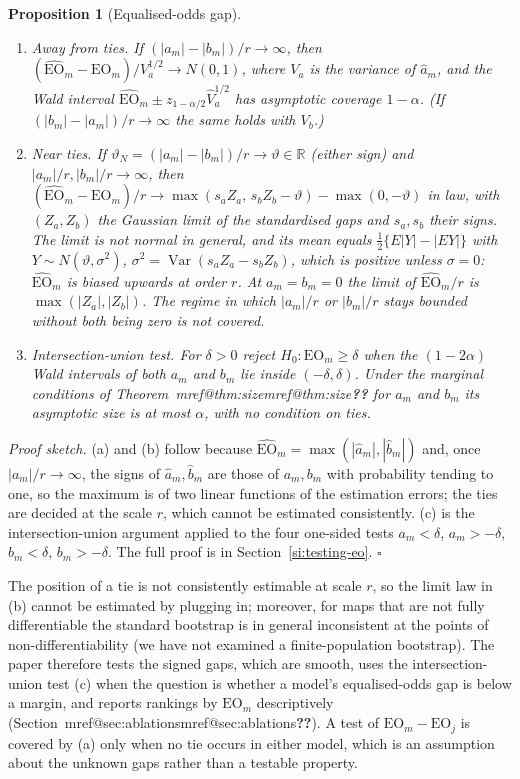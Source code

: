 \documentclass[pdflatex,sn-mathphys-num,iicol]{sn-jnl}
\makeatletter
\theoremstyle{thmstyleone}
\newtheorem{proposition}{Proposition}
\theoremstyle{thmstyletwo}
\theoremstyle{thmstylethree}
\newcommand{\Mref}[1]{\ifcsname mref@#1\endcsname\csname mref@#1\endcsname\else\textbf{??}\fi}
\makeatother
\begin{document}
\begin{proposition}[Equalised-odds gap]\label{prop:eo}
\begin{enumerate}
\item[(a)] \emph{Away from ties.} If $(|a_m|-|b_m|)/r\to\infty$, then $(\widehat{\mathrm{EO}}_m-\mathrm{EO}_m)/V_{a}^{1/2}\to N(0,1)$, where $V_a$ is the variance of $\hat a_m$, and the Wald interval $\widehat{\mathrm{EO}}_m\pm z_{1-\alpha/2}\hat V_a^{1/2}$ has asymptotic coverage $1-\alpha$. (If $(|b_m|-|a_m|)/r\to\infty$ the same holds with $V_b$.)
\item[(b)] \emph{Near ties.} If $\vartheta_N=(|a_m|-|b_m|)/r\to\vartheta\in\mathbb R$ (either sign) and $|a_m|/r,|b_m|/r\to\infty$, then $(\widehat{\mathrm{EO}}_m-\mathrm{EO}_m)/r\to\max(s_aZ_a,\,s_bZ_b-\vartheta)-\max(0,-\vartheta)$ in law, with $(Z_a,Z_b)$ the Gaussian limit of the standardised gaps and $s_a,s_b$ their signs. The limit is not normal in general, and its mean equals $\tfrac12\{E|Y|-|EY|\}$ with $Y\sim N(\vartheta,\sigma^2)$, $\sigma^2=\operatorname{Var}(s_aZ_a-s_bZ_b)$, which is positive unless $\sigma=0$: $\widehat{\mathrm{EO}}_m$ is biased upwards at order $r$. At $a_m=b_m=0$ the limit of $\widehat{\mathrm{EO}}_m/r$ is $\max(|Z_a|,|Z_b|)$. The regime in which $|a_m|/r$ or $|b_m|/r$ stays bounded without both being zero is not covered.
\item[(c)] \emph{Intersection-union test.} For $\delta>0$ reject $H_0:\mathrm{EO}_m\ge\delta$ when the $(1-2\alpha)$ Wald intervals of both $a_m$ and $b_m$ lie inside $(-\delta,\delta)$. Under the marginal conditions of Theorem~\Mref{thm:size} for $a_m$ and $b_m$ its asymptotic size is at most $\alpha$, with no condition on ties.
\end{enumerate}
\end{proposition}

\emph{Proof sketch.} (a) and (b) follow because $\widehat{\mathrm{EO}}_m=\max(|\hat a_m|,|\hat b_m|)$ and, once $|a_m|/r\to\infty$, the signs of $\hat a_m,\hat b_m$ are those of $a_m,b_m$ with probability tending to one, so the maximum is of two linear functions of the estimation errors; the ties are decided at the scale $r$, which cannot be estimated consistently. (c) is the intersection-union argument applied to the four one-sided tests $a_m<\delta$, $a_m>-\delta$, $b_m<\delta$, $b_m>-\delta$. The full proof is in Section~\ref{si:testing-eo}. $\square$

The position of a tie is not consistently estimable at scale $r$, so the limit law in (b) cannot be estimated by plugging in; moreover, for maps that are not fully differentiable the standard bootstrap is in general inconsistent at the points of non-differentiability \citep{fang2019} (we have not examined a finite-population bootstrap). The paper therefore tests the signed gaps, which are smooth, uses the intersection-union test (c) when the question is whether a model's equalised-odds gap is below a margin, and reports rankings by $\mathrm{EO}_m$ descriptively (Section~\Mref{sec:ablations}). A test of $\mathrm{EO}_m-\mathrm{EO}_j$ is covered by (a) only when no tie occurs in either model, which is an assumption about the unknown gaps rather than a testable property.
\end{document}

